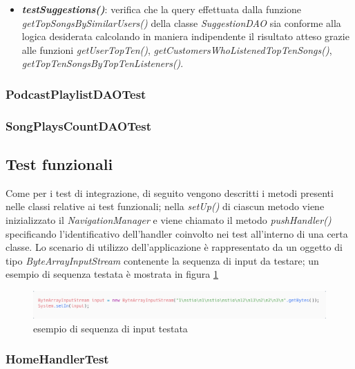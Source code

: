 \documentclass{article}
\begin{document}
  \begin{itemize}
    \item
    \textbf{\textit{testSuggestions()}}: verifica che la query effettuata dalla funzione
    \textit{getTopSongsBySimilarUsers()} della classe \textit{SuggestionDAO} sia conforme alla logica desiderata
    calcolando in maniera indipendente il risultato atteso grazie alle funzioni \textit{getUserTopTen()},
    \textit{getCustomersWhoListenedTopTenSongs()}, \textit{getTopTenSongsByTopTenListeners()}.
  \end{itemize}

  \subsubsection{PodcastPlaylistDAOTest}

  \subsubsection{SongPlaysCountDAOTest}

  \subsection{Test funzionali}

  Come per i test di integrazione, di seguito vengono descritti i metodi presenti nelle classi relative ai test funzionali; nella \textit{setUp()} di ciascun metodo viene inizializzato il \textit{NavigationManager} e viene chiamato il metodo \textit{pushHandler()} specificando l'identificativo dell'handler coinvolto nei test all'interno di una certa classe. Lo scenario di utilizzo dell'applicazione è rappresentato da un oggetto di tipo \textit{ByteArrayInputStream} contenente la sequenza di input da testare; un esempio di sequenza testata è mostrata in figura \ref{fig:testString}

  \begin{figure}[H]
    \centering
    \includegraphics[width=1\linewidth]{testString.png}
    \caption{esempio di sequenza di input testata}
    \label{fig:testString}
  \end{figure}

  \subsubsection{HomeHandlerTest}
\end{document}
